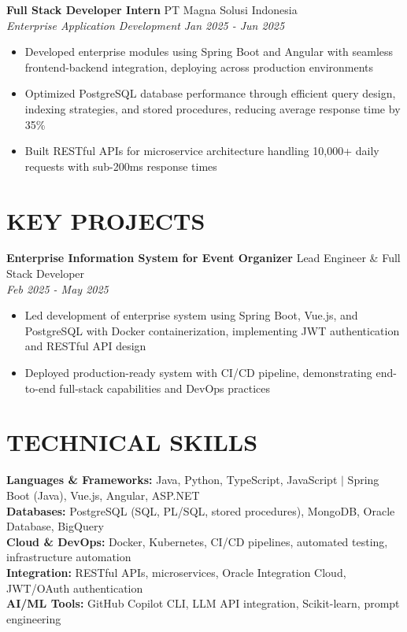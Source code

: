 \documentclass[10pt,a4paper]{article}
\newcommand{\experienceheader}[4]{
    \textbf{#1} \hfill #2 \\
    \textit{#3} \hfill \textit{#4}
}
\begin{document}
\experienceheader{Full Stack Developer Intern}{PT Magna Solusi Indonesia}{Enterprise Application Development}{Jan 2025 - Jun 2025}
\begin{itemize}[leftmargin=*, itemsep=1pt, topsep=1pt]
    \item Developed enterprise modules using Spring Boot and Angular with seamless frontend-backend integration, deploying across production environments
    \item Optimized PostgreSQL database performance through efficient query design, indexing strategies, and stored procedures, reducing average response time by 35\%
    \item Built RESTful APIs for microservice architecture handling 10,000+ daily requests with sub-200ms response times
\end{itemize}

\section*{KEY PROJECTS}

\experienceheader{Enterprise Information System for Event Organizer}{Lead Engineer \& Full Stack Developer}{}{Feb 2025 - May 2025}
\begin{itemize}[leftmargin=*, itemsep=1pt, topsep=1pt]
    \item Led development of enterprise system using Spring Boot, Vue.js, and PostgreSQL with Docker containerization, implementing JWT authentication and RESTful API design
    \item Deployed production-ready system with CI/CD pipeline, demonstrating end-to-end full-stack capabilities and DevOps practices
\end{itemize}

\section*{TECHNICAL SKILLS}

\textbf{Languages \& Frameworks:} Java, Python, TypeScript, JavaScript $|$ Spring Boot (Java), Vue.js, Angular, ASP.NET \\
\textbf{Databases:} PostgreSQL (SQL, PL/SQL, stored procedures), MongoDB, Oracle Database, BigQuery \\
\textbf{Cloud \& DevOps:} Docker, Kubernetes, CI/CD pipelines, automated testing, infrastructure automation \\
\textbf{Integration:} RESTful APIs, microservices, Oracle Integration Cloud, JWT/OAuth authentication \\
\textbf{AI/ML Tools:} GitHub Copilot CLI, LLM API integration, Scikit-learn, prompt engineering
\end{document}
